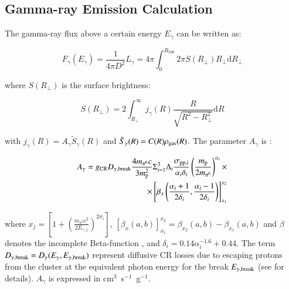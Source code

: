 \documentclass[traditabstract]{aa}
\newcommand{\rmn}{\mathrm}
\begin{document}
\begin{appendix}
\section{Gamma-ray Emission Calculation}
\label{app:C}

The gamma-ray flux above a certain energy $E_{\gamma}$ can be written as:

\begin{equation}
F_{\gamma} (E_{\gamma}) = \frac{1}{4\pi D^{2}} L_{\gamma} = 4\pi \int_{0}^{R_{500}} 2\pi S(R_{\perp}) R_{\perp} \rmn{d}R_{\perp}
\end{equation}

where $S(R_{\perp})$ is the surface brightness:

\begin{equation}
S(R_{\perp}) = 2 \int_{R_{\perp}}^{\infty} j_{\gamma}(R) \frac{R}{\sqrt{R^{2}-R_{\perp}^{2}}} \rmn{d}R
\end{equation}

with $ j_{\gamma}(R)=A_{\gamma}\tilde{S}_{\gamma}(R)$ and $\tilde{S}_{\gamma}(R)  =  C(R) \rho_{\rm{gas}}(R)$. The parameter $A_{\gamma}$ is \citep{2010MNRAS.409..449P}:

\begin{eqnarray}
A_{\gamma} = g_{\rm{CR}} D_{\gamma,\rm{break}} \frac{4 m_{\pi^{0}} c}{3 m_{\rm{p}}^{2}} \Sigma_{i=1}^{3} \Delta_{i} \frac{\sigma_{\rm{pp},i}}{\alpha_{i} \delta_{i}} \left( \frac{m_{\rm{p}}}{2 m_{\pi^{0}}} \right)^{\alpha_{i}} \times \nonumber \\
\times \left[ \beta_{x} \left( \frac{\alpha_{i}+1}{2\delta_{i}}, \frac{\alpha_{i}-1}{2\delta_{i}} \right) \right]_{x_{1}}^{x_{2}} 
\end{eqnarray}

where $x_{j}=\left[ 1 + \left( \frac{m_{\pi^{0}}c^2}{2E_{\gamma,j}} \right)^{2\sigma_{i}} \right]$, $\left[ \beta_{x}(a,b) \right]_{x_1}^{x_2} = \beta_{x_2}(a,b)-\beta_{x_1}(a,b)$ and $\beta$ denotes the incomplete Beta-function \citep{1965hmfw.book.....A}, and $\delta_{i}=0.14\alpha_{i}^{-1.6}+0.44$. The term $D_{\gamma, \rm{break}}=D_{\gamma}(E_{\gamma},E_{\gamma,\rm{break}})$ represent diffusive CR losses due to escaping protons from the cluster at the equivalent photon energy for the break $E_{\gamma, \rm{break}}$ (see \citealp{2010MNRAS.409..449P} for details). $A_{\gamma}$ is expressed in cm$^3$~s$^{-1}$~g$^{-1}$. 


\end{appendix}
\end{document}
